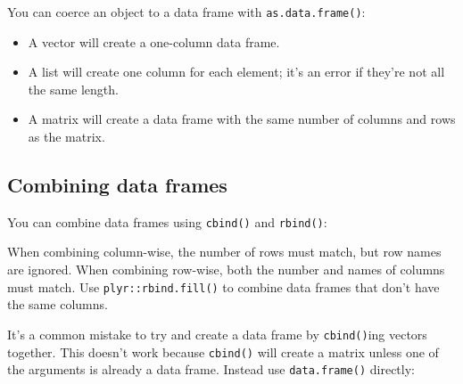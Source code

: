 You can coerce an object to a data frame with \texttt{as.data.frame()}:

\begin{itemize}
\item
  A vector will create a one-column data frame.
\item
  A list will create one column for each element; it's an error if
  they're not all the same length.
\item
  A matrix will create a data frame with the same number of columns and
  rows as the matrix.
\end{itemize}

\subsection{Combining data frames}

You can combine data frames using \texttt{cbind()} and \texttt{rbind()}:
 

\begin{Shaded}
\begin{Highlighting}[]
\NormalTok{(} \NormalTok{:}\NormalTok{))}
\NormalTok{(} \NormalTok{, } \NormalTok{))}
\end{Highlighting}
\end{Shaded}

When combining column-wise, the number of rows must match, but row names
are ignored. When combining row-wise, both the number and names of
columns must match. Use \texttt{plyr::rbind.fill()} to combine data
frames that don't have the same columns.

It's a common mistake to try and create a data frame by
\texttt{cbind()}ing vectors together. This doesn't work because
\texttt{cbind()} will create a matrix unless one of the arguments is
already a data frame. Instead use \texttt{data.frame()} directly:

